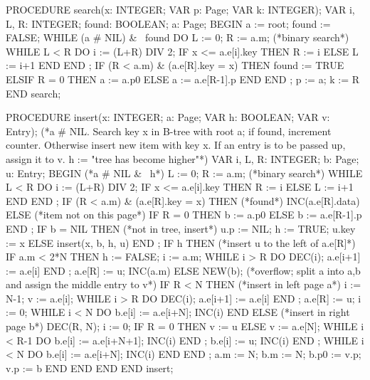 PROCEDURE search(x: INTEGER; VAR p: Page; VAR k: INTEGER);
  VAR i, L, R: INTEGER; found: BOOLEAN; a: Page;
BEGIN a := root; found := FALSE;
  WHILE (a # NIL) & ~found DO
    L := 0; R := a.m; (*binary search*)
    WHILE L < R DO
      i := (L+R) DIV 2;
      IF x <= a.e[i].key THEN R := i ELSE L := i+1 END
    END ;
    IF (R < a.m) & (a.e[R].key = x) THEN found := TRUE
    ELSIF R = 0 THEN a := a.p0
    ELSE a := a.e[R-1].p
    END
  END ;
  p := a; k := R
END search;

PROCEDURE insert(x: INTEGER; a: Page; VAR h: BOOLEAN; VAR v: Entry);
  (*a # NIL. Search key x in B-tree with root a; if found, increment counter.
   Otherwise insert new item with key x. If an entry is to be passed up,
   assign it to v. h := "tree has become higher"*)
  VAR i, L, R: INTEGER;
    b: Page; u: Entry;
  BEGIN (*a # NIL & ~h*)
    L := 0; R := a.m; (*binary search*)
    WHILE L < R DO
      i := (L+R) DIV 2;
      IF x <= a.e[i].key THEN R := i ELSE L := i+1 END
    END ;
    IF (R < a.m) & (a.e[R].key = x) THEN (*found*) INC(a.e[R].data)
    ELSE (*item not on this page*)
      IF R = 0 THEN b := a.p0 ELSE b := a.e[R-1].p END ;
      IF b = NIL THEN (*not in tree, insert*)
        u.p := NIL; h := TRUE; u.key := x
      ELSE insert(x, b, h, u)
      END ;
      IF h THEN (*insert u to the left of a.e[R]*)
        IF a.m < 2*N THEN
          h := FALSE; i := a.m;
          WHILE i > R DO DEC(i); a.e[i+1] := a.e[i] END ;
          a.e[R] := u; INC(a.m)
        ELSE NEW(b); (*overflow; split a into a,b and assign the middle entry to v*)
        IF R < N THEN (*insert in left page a*)
          i := N-1; v := a.e[i];
          WHILE i > R DO DEC(i); a.e[i+1] := a.e[i] END ;
          a.e[R] := u; i := 0;
          WHILE i < N DO b.e[i] := a.e[i+N]; INC(i) END
        ELSE (*insert in right page b*)
          DEC(R, N); i := 0;
          IF R = 0 THEN v := u
          ELSE v := a.e[N];
            WHILE i < R-1 DO b.e[i] := a.e[i+N+1]; INC(i) END ;
            b.e[i] := u; INC(i)
          END ;
          WHILE i < N DO b.e[i] := a.e[i+N]; INC(i) END
        END ;
        a.m := N; b.m := N; b.p0 := v.p; v.p := b
      END
    END
  END
END insert;

